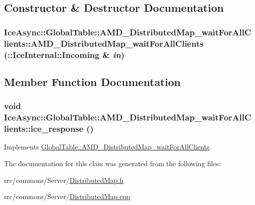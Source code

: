 \subsection{Constructor \& Destructor Documentation}
\hypertarget{class_ice_async_1_1_global_table_1_1_a_m_d___distributed_map__wait_for_all_clients_a69c4ad387840c53dab9b3e8dee1313c6}{
\subsubsection[{AMD\_\-DistributedMap\_\-waitForAllClients}]{\setlength{\rightskip}{0pt plus 5cm}IceAsync::GlobalTable::AMD\_\-DistributedMap\_\-waitForAllClients::AMD\_\-DistributedMap\_\-waitForAllClients (::IceInternal::Incoming \& {\em in})}}
\label{class_ice_async_1_1_global_table_1_1_a_m_d___distributed_map__wait_for_all_clients_a69c4ad387840c53dab9b3e8dee1313c6}


\subsection{Member Function Documentation}
\hypertarget{class_ice_async_1_1_global_table_1_1_a_m_d___distributed_map__wait_for_all_clients_adfccfd863dbf495a0f821b1b02b0893e}{
\subsubsection[{ice\_\-response}]{\setlength{\rightskip}{0pt plus 5cm}void IceAsync::GlobalTable::AMD\_\-DistributedMap\_\-waitForAllClients::ice\_\-response ()}}
\label{class_ice_async_1_1_global_table_1_1_a_m_d___distributed_map__wait_for_all_clients_adfccfd863dbf495a0f821b1b02b0893e}


Implements \hyperlink{class_global_table_1_1_a_m_d___distributed_map__wait_for_all_clients_ad65fc8a54f2504c84eb145d310be1b20}{GlobalTable::AMD\_\-DistributedMap\_\-waitForAllClients}.



The documentation for this class was generated from the following files:\begin{DoxyCompactItemize}
\item 
src/commons/Server/\hyperlink{_distributed_map_8h}{DistributedMap.h}\item 
src/commons/Server/\hyperlink{_distributed_map_8cpp}{DistributedMap.cpp}\end{DoxyCompactItemize}
